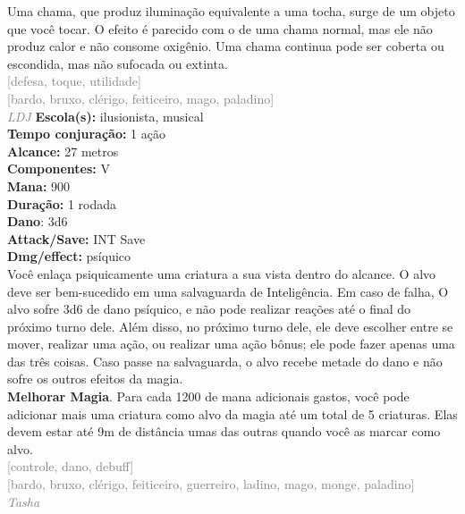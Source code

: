 \documentclass{RPG_Adventure}[2021/10/20]
\begin{document}
{\normalsize Uma chama, que produz iluminação equivalente a uma tocha, surge de um objeto que você tocar. O efeito é parecido com o de uma chama normal, mas ele não produz calor e não consome oxigênio. Uma chama continua pode ser coberta ou escondida, mas não sufocada ou extinta.\\}
{\scriptsize \textcolor{gray}{[defesa, toque, utilidade]\\}}
{\scriptsize \textcolor{gray}{[bardo, bruxo, clérigo, feiticeiro, mago, paladino]\\}}
{\tiny \textcolor{gray}{\textit{LDJ}}}
{\small \t \textbf{Escola(s):} ilusionista, musical\\\t \textbf{Tempo conjuração:} 1 ação\\\t \textbf{Alcance:} 27 metros\\\t \textbf{Componentes:} V\\\t \textbf{Mana:} 900\\\t \textbf{Duração:} 1 rodada\\\t \textbf{Dano}: 3d6\\\t \textbf{Attack/Save:} INT Save\\\t \textbf{Dmg/effect:} psíquico\\}
{\normalsize Você enlaça psiquicamente uma criatura a sua vista dentro do alcance. O alvo deve ser bem-sucedido em uma salvaguarda de Inteligência. Em caso de falha, O alvo sofre 3d6 de dano psíquico, e não pode realizar reações até o final do próximo turno dele. Além disso, no próximo turno dele, ele deve escolher entre se mover, realizar uma ação, ou realizar uma ação bônus; ele pode fazer apenas uma das três coisas. Caso passe na salvaguarda, o alvo recebe metade do dano e não sofre os outros efeitos da magia.\\\t \textbf{Melhorar Magia}. Para cada 1200 de mana adicionais gastos, você pode adicionar mais uma criatura como alvo da magia até um total de 5 criaturas. Elas devem estar até 9m de distância umas das outras quando você as marcar como alvo.\\}
{\scriptsize \textcolor{gray}{[controle, dano, debuff]\\}}
{\scriptsize \textcolor{gray}{[bardo, bruxo, clérigo, feiticeiro, guerreiro, ladino, mago, monge, paladino]\\}}
{\tiny \textcolor{gray}{\textit{Tasha}}}
\end{document}
